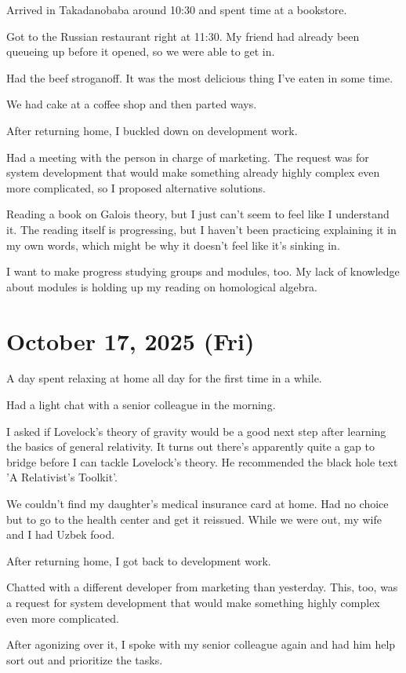 \documentclass[uplatex]{jsarticle}
\begin{document}
Arrived in Takadanobaba around 10:30 and spent time at a bookstore.

Got to the Russian restaurant right at 11:30. My friend had already been queueing up before it opened, so we were able to get in.

Had the beef stroganoff. It was the most delicious thing I've eaten in some time.

We had cake at a coffee shop and then parted ways.

After returning home, I buckled down on development work.

Had a meeting with the person in charge of marketing. The request was for system development that would make something already highly complex even more complicated, so I proposed alternative solutions.

Reading a book on Galois theory, but I just can't seem to feel like I understand it.
The reading itself is progressing, but I haven't been practicing explaining it in my own words, which might be why it doesn't feel like it's sinking in.

I want to make progress studying groups and modules, too.
My lack of knowledge about modules is holding up my reading on homological algebra.

\section{October 17, 2025 (Fri)}

A day spent relaxing at home all day for the first time in a while.

Had a light chat with a senior colleague in the morning.

I asked if Lovelock's theory of gravity would be a good next step after learning the basics of general relativity. It turns out there's apparently quite a gap to bridge before I can tackle Lovelock's theory.
He recommended the black hole text 'A Relativist's Toolkit'.

We couldn't find my daughter's medical insurance card at home. Had no choice but to go to the health center and get it reissued.
While we were out, my wife and I had Uzbek food.

After returning home, I got back to development work.

Chatted with a different developer from marketing than yesterday.
This, too, was a request for system development that would make something highly complex even more complicated.

After agonizing over it, I spoke with my senior colleague again and had him help sort out and prioritize the tasks.
\end{document}
